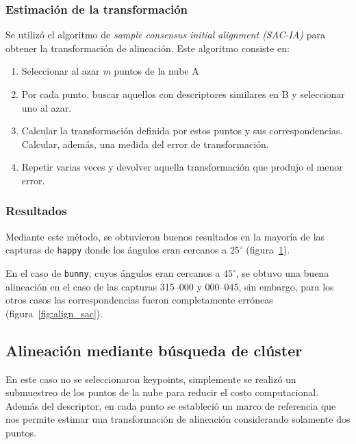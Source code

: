 		\subsubsection{Estimación de la transformación}
			Se utilizó el algoritmo de \emph{sample consensus initial alignment
			(SAC-IA)} para obtener la transformación de alineación. Este algoritmo
			consiste en:
			\begin{enumerate}
				\item Seleccionar al azar \emph{m} puntos de la nube A
				\item Por cada punto, buscar aquellos con descriptores similares en B y seleccionar uno al azar.
				\item Calcular la transformación definida por estos puntos y
					sus correspondencias. Calcular, además, una medida del
					error de transformación.
				\item Repetir varias veces y devolver aquella transformación que produjo el menor error.\cite{Rusu:2009:FPF:1703435.1703733}
			\end{enumerate}

		\subsubsection{Resultados} %
			Mediante este método, se obtuvieron buenos resultados en la mayoría de las
			capturas de \texttt{happy}
			donde los ángulos eran cercanos a $25^{\circ}$ (figura~\ref{fig:sac_angles}).

			\begin{figure}
				\caption{\label{fig:sac_angles}}
			\end{figure}

			En el caso de \texttt{bunny}, cuyos ángulos eran cercanos a $45^{\circ}$,
			se obtuvo una buena alineación en el caso de las capturas 315--000 y 000--045,
			sin embargo, para los otros casos las correspondencias fueron completamente erróneas (figura~\ref{fig:align_sac}).


	\subsection{Alineación mediante búsqueda de clúster}
		En este caso no se seleccionaron keypoints, simplemente se realizó un submuestreo de
		los puntos de la nube para reducir el costo computacional.
		Además del descriptor, en cada punto se estableció un marco de referencia
		que nos permite estimar
		una transformación de alineación considerando solamente dos puntos\cite{ISS}.

